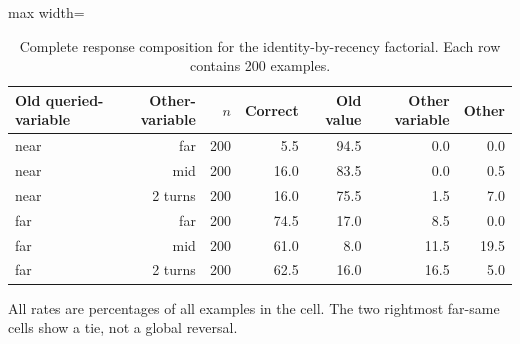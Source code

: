 \begin{table}[htbp]
\centering
\footnotesize
\setlength{\tabcolsep}{4.5pt}
\caption{Complete response composition for the identity-by-recency factorial. Each row contains 200 examples.}
\label{tab:factorial}
\begin{adjustbox}{max width=\textwidth}
\begin{tabular}{lrrrrrr}
\toprule
Old queried-variable & Other-variable & $n$ & Correct & Old value & Other variable & Other \\
\midrule
near & far & 200 & 5.5 & 94.5 & 0.0 & 0.0 \\
near & mid & 200 & 16.0 & 83.5 & 0.0 & 0.5 \\
near & 2 turns & 200 & 16.0 & 75.5 & 1.5 & 7.0 \\
far & far & 200 & 74.5 & 17.0 & 8.5 & 0.0 \\
far & mid & 200 & 61.0 & 8.0 & 11.5 & 19.5 \\
far & 2 turns & 200 & 62.5 & 16.0 & 16.5 & 5.0 \\
\bottomrule
\end{tabular}
\end{adjustbox}
\vspace{2pt}\parbox{0.96\linewidth}{\footnotesize All rates are percentages of all examples in the cell. The two rightmost far-same cells show a tie, not a global reversal.}
\end{table}
